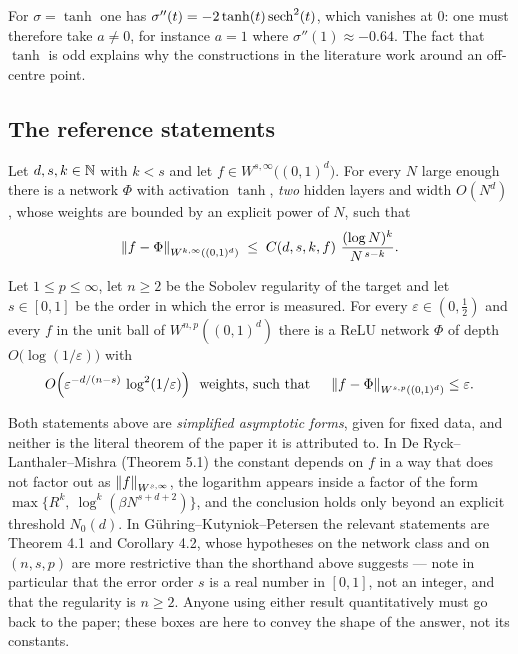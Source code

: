 \documentclass[11pt,a4paper]{article}
\begin{document}
\begin{remark}
For $\sigma = \tanh$ one has $\sigma''(t) = -2\tanh(t)\operatorname{sech}^2(t)$, which vanishes at $0$: one must
therefore take $a \ne 0$, for instance $a = 1$ where $\sigma''(1) \approx -0.64$. The fact that
$\tanh$ is odd explains why the constructions in the literature work around an off-centre point.
\end{remark}

\subsection{The reference statements}

\begin{theorem}\label{th:drlm}
Let $d, s, k \in \mathbb{N}$ with $k < s$ and let $f \in W^{s,\infty}\big((0,1)^d\big)$. For every $N$
large enough there is a network $\Phi$ with activation $\tanh$, \emph{two} hidden layers and width
$O(N^d)$, whose weights are bounded by an explicit power of $N$, such that
\[
\left\lVert f - \Phi \right\rVert_{W^{k,\infty}((0,1)^d)} \;\le\; C(d,s,k,f)\ \frac{(\log N)^{k}}{N^{\,s-k}} .
\]
\end{theorem}

\begin{theorem}\label{th:gkp}
Let $1 \le p \le \infty$, let $n \ge 2$ be the Sobolev regularity of the target and let
$s \in [0,1]$ be the order in which the error is measured. For every $\varepsilon \in (0,\tfrac12)$
and every $f$ in the unit ball of $W^{n,p}((0,1)^d)$ there is a ReLU network $\Phi$ of depth
$O\big(\log(1/\varepsilon)\big)$ with
\[
O\Big( \varepsilon^{-d/(n-s)}\,\log^2(1/\varepsilon) \Big) \ \text{ weights, such that }\quad
\left\lVert f - \Phi \right\rVert_{W^{s,p}((0,1)^d)} \le \varepsilon .
\]
\end{theorem}

\begin{remark}\label{rem:sobolev-caveat}
Both statements above are \emph{simplified asymptotic forms}, given for fixed data, and neither is
the literal theorem of the paper it is attributed to. In De Ryck--Lanthaler--Mishra (Theorem 5.1) the
constant depends on $f$ in a way that does not factor out as $\left\lVert f \right\rVert_{W^{s,\infty}}$, the
logarithm appears inside a factor of the form $\max\{R^k,\ \log^k(\beta N^{s+d+2})\}$, and the
conclusion holds only beyond an explicit threshold $N_0(d)$. In Gühring--Kutyniok--Petersen the
relevant statements are Theorem 4.1 and Corollary 4.2, whose hypotheses on the network class and on
$(n,s,p)$ are more restrictive than the shorthand above suggests --- note in particular that the
error order $s$ is a real number in $[0,1]$, not an integer, and that the regularity is $n \ge 2$.
Anyone using either result quantitatively must go back to the paper; these boxes are here to convey
the shape of the answer, not its constants.
\end{remark}
\end{document}
